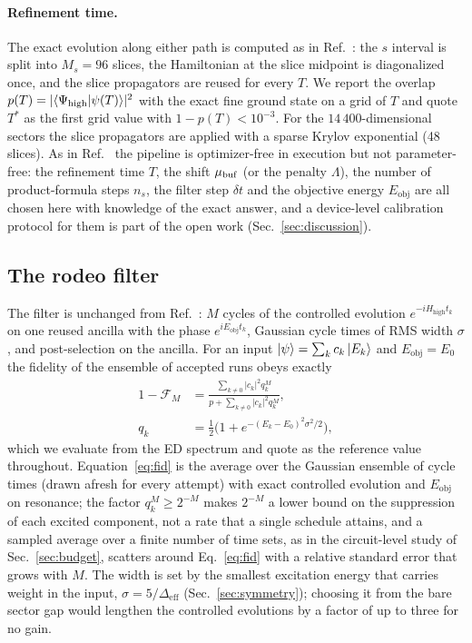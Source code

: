 \documentclass[
  aps,
  prc,
  reprint,
  superscriptaddress,
  floatfix,
  nofootinbib
]{revtex4-2}
\newcommand{\Hhigh}{H_{\mathrm{high}}}
\newcommand{\Eobj}{E_{\mathrm{obj}}}
\newcommand{\Deff}{\Delta_{\mathrm{eff}}}
\begin{document}
\paragraph{Refinement time.}
The exact evolution along either path is computed as in
Ref.~\cite{EigenQPairing2026}: the $s$ interval is split into $M_s=96$
slices, the Hamiltonian at the slice midpoint is diagonalized once, and the
slice propagators are reused for every $T$.  We report the overlap
$p(T)=|\langle\Psi_{\rm high}|\psi(T)\rangle|^2$ with the exact fine ground
state on a grid of $T$ and quote $T^*$ as the first grid value with
$1-p(T)<10^{-3}$.  For the $14\,400$-dimensional sectors the slice
propagators are applied with a sparse Krylov exponential (48 slices).  As in
Ref.~\cite{EigenQPairing2026} the pipeline is optimizer-free in execution but
not parameter-free: the refinement time $T$, the shift $\mu_{\rm buf}$ (or
the penalty $\Lambda$), the number of product-formula steps $n_s$, the filter
step $\delta t$ and the objective energy $\Eobj$ are all chosen here with
knowledge of the exact answer, and a device-level calibration protocol for
them is part of the open work (Sec.~\ref{sec:discussion}).

\subsection{The rodeo filter}
\label{sec:rodeo}
The filter is unchanged from Ref.~\cite{EigenQPairing2026}: $M$ cycles of
the controlled evolution $e^{-i\Hhigh t_k}$ on one reused ancilla with the
phase $e^{i\Eobj t_k}$, Gaussian cycle times of RMS width $\sigma$, and
post-selection on the ancilla.  For an input
$\ket\psi=\sum_kc_k\ket{E_k}$ and $\Eobj=E_0$ the fidelity of the ensemble
of accepted runs obeys exactly
\begin{align}
  1-\mathcal F_M&=\frac{\sum_{k\neq0}|c_k|^2q_k^M}{p+\sum_{k\neq0}|c_k|^2q_k^M},\nonumber\\
  q_k&=\tfrac12\big(1+e^{-(E_k-E_0)^2\sigma^2/2}\big),
  \label{eq:fid}
\end{align}
which we evaluate from the ED spectrum and quote as the reference value
throughout.  Equation~\eqref{eq:fid} is the average over the Gaussian
ensemble of cycle times (drawn afresh for every attempt) with exact
controlled evolution and $\Eobj$ on resonance; the factor $q_k^M\ge2^{-M}$
makes $2^{-M}$ a lower bound on the suppression of each excited component,
not a rate that a single schedule attains, and a sampled average over a
finite number of time sets, as in the circuit-level study of
Sec.~\ref{sec:budget}, scatters around Eq.~\eqref{eq:fid} with a relative
standard error that grows with $M$.  The width is set by the smallest
excitation energy that carries weight in the input,
$\sigma=5/\Deff$ (Sec.~\ref{sec:symmetry}); choosing it from the bare sector
gap would lengthen the controlled evolutions by a factor of up to three for
no gain.
\end{document}
